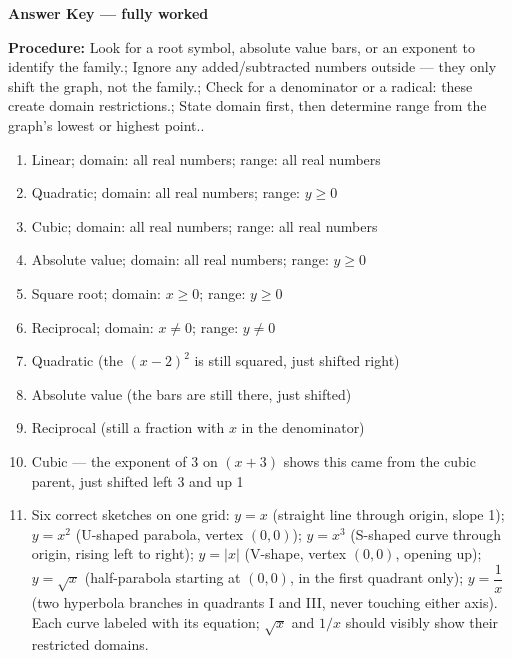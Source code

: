 \documentclass[12pt]{article}
\begin{document}
\newpage

\begin{center}{\Large \textbf{Answer Key --- fully worked}}\end{center}
\vspace{0.25cm}
\textbf{Procedure:} Look for a root symbol, absolute value bars, or an exponent to identify the family.; Ignore any added/subtracted numbers outside --- they only shift the graph, not the family.; Check for a denominator or a radical: these create domain restrictions.; State domain first, then determine range from the graph's lowest or highest point..\\[8pt]
\begin{enumerate}[label=\textbf{\arabic*.},itemsep=7pt]
  \item Linear; domain: all real numbers; range: all real numbers
  \item Quadratic; domain: all real numbers; range: $y\ge 0$
  \item Cubic; domain: all real numbers; range: all real numbers
  \item Absolute value; domain: all real numbers; range: $y\ge 0$
  \item Square root; domain: $x\ge 0$; range: $y\ge 0$
  \item Reciprocal; domain: $x\ne 0$; range: $y\ne 0$
  \item Quadratic (the $(x-2)^2$ is still squared, just shifted right)
  \item Absolute value (the bars are still there, just shifted)
  \item Reciprocal (still a fraction with $x$ in the denominator)
  \item Cubic --- the exponent of 3 on $(x+3)$ shows this came from the cubic parent, just shifted left 3 and up 1
  \item Six correct sketches on one grid: $y=x$ (straight line through origin, slope 1); $y=x^{2}$ (U-shaped parabola, vertex $(0,0)$); $y=x^{3}$ (S-shaped curve through origin, rising left to right); $y=|x|$ (V-shape, vertex $(0,0)$, opening up); $y=\sqrt{x}$ (half-parabola starting at $(0,0)$, in the first quadrant only); $y=\dfrac{1}{x}$ (two hyperbola branches in quadrants I and III, never touching either axis). Each curve labeled with its equation; $\sqrt{x}$ and $1/x$ should visibly show their restricted domains.
\end{enumerate}
\end{document}
